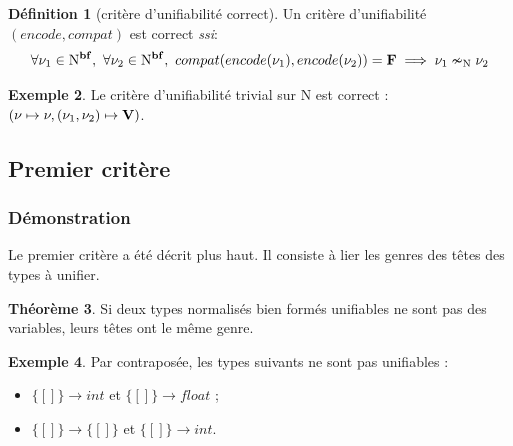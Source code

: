 \documentclass[a4paper]{report}
\theoremstyle{definition}
\newtheorem{theoreme}{Théorème}
\newtheorem{definition}[theoreme]{Définition}
\newtheorem{exemple}[theoreme]{Exemple}
\newcommand{\mset}[1]{\{\![#1]\!\}}
\newcommand{\ssi}{\textit{ssi}\xspace}
\newcommand{\N}{\mathrm{N}}
\begin{document}
\begin{definition}[critère d'unifiabilité correct]
  Un critère d'unifiabilité $(encode, compat)$ est correct \ssi :
  \[ \forall \nu_1 \in \N^{\bold{bf}},\ \forall \nu_2 \in \N^{\bold{bf}},\ compat (encode (\nu_1), encode (\nu_2)) = \bold{F} \implies \nu_1 \nsim_\N \nu_2 \]
\end{definition}

\begin{exemple}
  Le critère d'unifiabilité trivial sur $\N$ est correct : $(\nu \mapsto \nu, (\nu_1, \nu_2) \mapsto \bold{V})$.
\end{exemple}


\subsection{Premier critère}

\subsubsection{Démonstration}

Le premier critère a été décrit plus haut. Il consiste à lier les genres des têtes des types à unifier.

\begin{theoreme} \label{thm_cond1}
  Si deux types normalisés bien formés unifiables ne sont pas des variables, leurs têtes ont le même genre.
\end{theoreme}

\begin{exemple}
  Par contraposée, les types suivants ne sont pas unifiables :
  \begin{itemize}
    \item $\mset{} \rightarrow int$ et $\mset{} \rightarrow float$ ;
    \item $\mset{} \rightarrow \mset{}$ et $\mset{} \rightarrow int$.
  \end{itemize}
\end{exemple}
\end{document}
